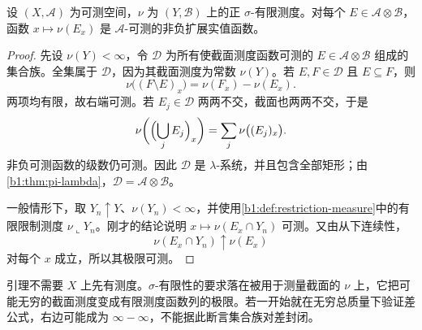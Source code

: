 \begin{lemma}\label{b1:lem:section-measure-measurable}
设 \((X,\mathcal A)\) 为可测空间，\(\nu\) 为 \((Y,\mathcal B)\) 上的正 \(\sigma\)-有限测度。对每个 \(E\in\mathcal A\otimes\mathcal B\)，函数 \(x\mapsto\nu(E_x)\) 是 \(\mathcal A\)-可测的非负扩展实值函数。
\end{lemma}
\begin{proof}
先设 \(\nu(Y)<\infty\)，令 \(\mathcal D\) 为所有使截面测度函数可测的 \(E\in\mathcal A\otimes\mathcal B\) 组成的集合族。全集属于 \(\mathcal D\)，因为其截面测度为常数 \(\nu(Y)\)。若 \(E,F\in\mathcal D\) 且 \(E\subseteq F\)，则
\[
\nu\bigl((F\setminus E)_x\bigr)=\nu(F_x)-\nu(E_x).
\]
两项均有限，故右端可测。若 \(E_j\in\mathcal D\) 两两不交，截面也两两不交，于是
\[
\nu\biggl(\Bigl(\bigcup_jE_j\Bigr)_x\biggr)
=\sum_j\nu\bigl((E_j)_x\bigr).
\]
非负可测函数的级数仍可测。因此 \(\mathcal D\) 是 \(\lambda\)-系统，并且包含全部矩形；由\cref{b1:thm:pi-lambda}，\(\mathcal D=\mathcal A\otimes\mathcal B\)。

一般情形下，取 \(Y_n\uparrow Y\)、\(\nu(Y_n)<\infty\)，并使用\cref{b1:def:restriction-measure}中的有限限制测度 \(\nu\llcorner Y_n\)。刚才的结论说明 \(x\mapsto\nu(E_x\cap Y_n)\) 可测。又由从下连续性，
\[
\nu(E_x\cap Y_n)\uparrow\nu(E_x)
\]
对每个 \(x\) 成立，所以其极限可测。
\end{proof}

引理不需要 \(X\) 上先有测度。\(\sigma\)-有限性的要求落在被用于测量截面的 \(\nu\) 上，它把可能无穷的截面测度变成有限测度函数列的极限。若一开始就在无穷总质量下验证差公式，右边可能成为 \(\infty-\infty\)，不能据此断言集合族对差封闭。

